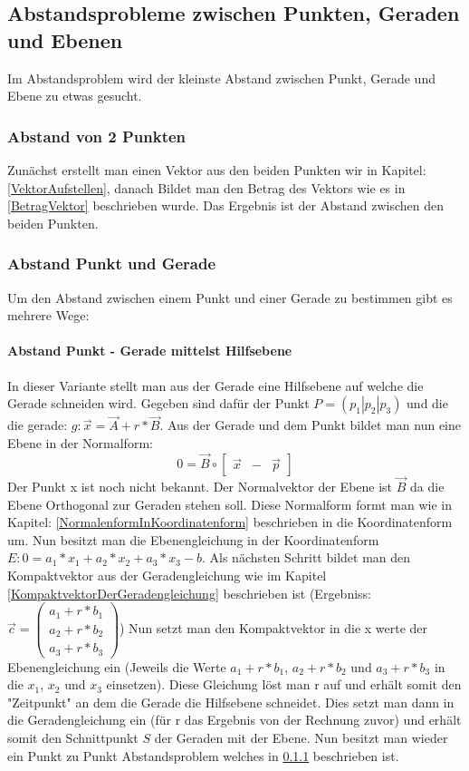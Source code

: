 \documentclass{article}
\begin{document}
\subsection{Abstandsprobleme zwischen Punkten, Geraden und Ebenen}
Im Abstandsproblem wird der kleinste Abstand zwischen Punkt, Gerade und Ebene zu etwas gesucht. 
\subsubsection{Abstand von 2 Punkten} \label{Abstand2Punkte}
Zunächst erstellt man einen Vektor aus den beiden Punkten wir in Kapitel: \ref{VektorAufstellen}, danach Bildet man den Betrag des Vektors wie es in \ref{BetragVektor} beschrieben wurde. Das Ergebnis ist der Abstand zwischen den beiden Punkten.

\subsubsection{Abstand Punkt und Gerade} \label{PunktGeradeAbstand}
Um den Abstand zwischen einem Punkt und einer Gerade zu bestimmen gibt es mehrere Wege:

\paragraph{Abstand Punkt - Gerade mittelst Hilfsebene}
In dieser Variante stellt man aus der Gerade eine Hilfsebene auf welche die Gerade schneiden wird. Gegeben sind dafür der Punkt $P = (p_1 | p_2 | p_3)$ und die die gerade: $g : \vec{x} = \vec{A} + r * \vec{B}$. Aus der Gerade und dem Punkt bildet man nun eine Ebene in der Normalform:
\begin{equation}
0 = \vec{B} \circ \begin{bmatrix} \vec{x} & - & \vec{p} \end{bmatrix}
\end{equation}
Der Punkt x ist noch nicht bekannt. Der Normalvektor der Ebene ist $\vec{B}$ da die Ebene Orthogonal zur Geraden stehen soll. Diese Normalform formt man wie in Kapitel: \ref{NormalenformInKoordinatenform} beschrieben in die Koordinatenform um. Nun besitzt man die Ebenengleichung in der Koordinatenform $E : 0 = a_1 * x_1 + a_2 * x_2 + a_3 * x_3 - b$. Als nächsten Schritt bildet man den Kompaktvektor aus der Geradengleichung wie im Kapitel \ref{KompaktvektorDerGeradengleichung} beschrieben ist (Ergebniss: $\vec{c} = \begin{pmatrix} a_1 + r * b_1 \\ a_2 + r * b_2 \\ a_3 + r * b_3 \end{pmatrix}$) Nun setzt man den Kompaktvektor in die x werte der Ebenengleichung ein (Jeweils die Werte $a_1 + r * b_1$, $a_2 + r * b_2$ und $a_3 + r * b_3$ in die $x_1$, $x_2$ und $x_3$ einsetzen). Diese Gleichung löst man r auf und erhält somit den "Zeitpunkt" an dem die Gerade die Hilfsebene schneidet. Dies setzt man dann in die Geradengleichung ein (für r das Ergebnis von der Rechnung zuvor) und erhält somit den Schnittpunkt $S$ der Geraden mit der Ebene. Nun besitzt man wieder ein Punkt zu Punkt Abstandsproblem welches in \ref{Abstand2Punkte} beschrieben ist.
\end{document}
